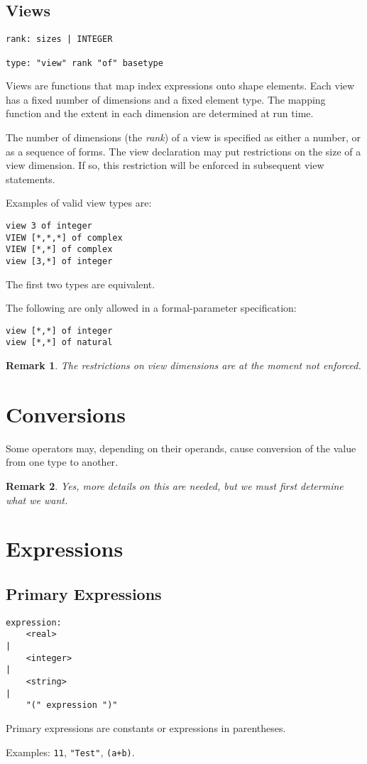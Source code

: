 \documentclass[a4paper]{article}
\newcommand{\defn}[1]{{\em #1}\index{#1}}
\newtheorem{remark}{Remark}
\begin{document}
\subsection{Views}
\begin{verbatim}
rank: sizes | INTEGER

type: "view" rank "of" basetype
\end{verbatim}
Views are functions that map index expressions onto shape elements.
Each view has a fixed number of dimensions and a fixed element type.
The mapping function and the extent in each dimension are determined
at run time.
\par
The number of dimensions (the \defn{rank}) of a view is specified as either
a number, or as a sequence of forms. The view declaration may
put restrictions on the size of a view dimension. If so, this
restriction will be enforced in subsequent view statements.
\par
Examples of valid view types are:
\begin{verbatim}
view 3 of integer
VIEW [*,*,*] of complex
VIEW [*,*] of complex
view [3,*] of integer
\end{verbatim}
The first two types are equivalent.
\par
The following are only allowed in a formal-parameter specification:
\begin{verbatim}
view [*,*] of integer
view [*,*] of natural
\end{verbatim}

\begin{remark}
The restrictions on view dimensions are at the moment not enforced.
\end{remark}

\section{Conversions}
Some operators may, depending on their operands, cause conversion of
the value from one type to another.
\begin{remark}
Yes, more details on this are needed, but we must first determine what
we want.
\end{remark}

\section{Expressions}
\subsection{Primary Expressions}
\begin{verbatim}
expression:
    <real>
|
    <integer>
|
    <string>
|
    "(" expression ")"
\end{verbatim}
Primary expressions are constants or expressions in parentheses.
\par
Examples: \verb"11", \verb'"Test"', \verb"(a+b)".
\end{document}
